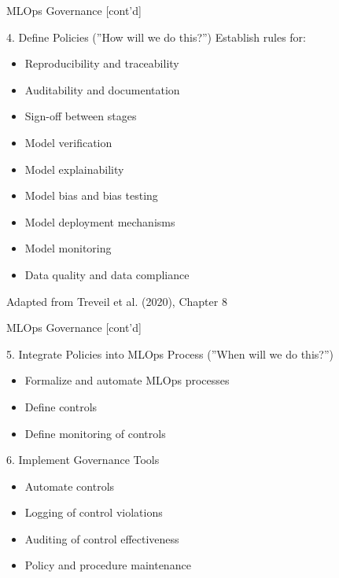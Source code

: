 \documentclass[ignorenonframetext,xcolor=x11names]{beamer}
\begin{document}
\begin{frame}{MLOps Governance \small [cont'd]}
\footnotesize
\begin{block}{4. Define Policies (''How will we do this?'')}
Establish rules for:
\begin{itemize}
   \item Reproducibility and traceability
   \item Auditability and documentation
   \item Sign-off between stages
   \item Model verification
   \item Model explainability
   \item Model bias and bias testing
   \item Model deployment mechanisms
   \item Model monitoring
   \item Data quality and data compliance
\end{itemize}
\end{block}
\tiny Adapted from Treveil et al. (2020), Chapter 8
\end{frame}

\begin{frame}{MLOps Governance \small [cont'd]}
\footnotesize
\begin{block}{5. Integrate Policies into MLOps Process (''When will we do this?'')}
\begin{itemize}
   \item Formalize and automate MLOps processes
   \item Define controls
   \item Define monitoring of controls
\end{itemize}
\end{block}

\begin{block}{6. Implement Governance Tools}
\begin{itemize}
   \item Automate controls
   \item Logging of control violations
   \item Auditing of control effectiveness
   \item Policy and procedure maintenance
\end{itemize}
\end{block}
\end{frame}
\end{document}
